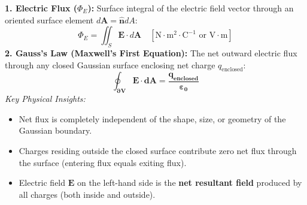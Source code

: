 \documentclass[10pt,a4paper]{article}
\begin{document}
\begin{conceptbox}
\textbf{1. Electric Flux ($\Phi_E$):}
Surface integral of the electric field vector through an oriented surface element $d\mathbf{A} = \hat{\mathbf{n}} dA$:
\begin{equation}
  \Phi_E = \iint_S \mathbf{E}\cdot d\mathbf{A} \quad [\mathrm{N}\cdot\mathrm{m}^2\cdot\mathrm{C}^{-1} \text{ or } \mathrm{V}\cdot\mathrm{m}]
\end{equation}
\textbf{2. Gauss's Law (Maxwell's First Equation):}
The net outward electric flux through any closed Gaussian surface enclosing net charge $q_{\text{enclosed}}$:
\begin{equation}
  \mathbf{\oint_{\partial V} \mathbf{E}\cdot d\mathbf{A} = \frac{q_{\text{enclosed}}}{\varepsilon_0}}
\end{equation}
\textit{Key Physical Insights:}
\begin{itemize}
  \item Net flux is completely independent of the shape, size, or geometry of the Gaussian boundary.
  \item Charges residing outside the closed surface contribute zero net flux through the surface (entering flux equals exiting flux).
  \item Electric field $\mathbf{E}$ on the left-hand side is the \textbf{net resultant field} produced by all charges (both inside and outside).
\end{itemize}
\end{conceptbox}
\end{document}
